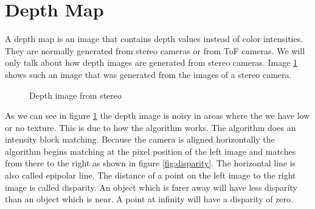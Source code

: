 \documentclass[11pt,a4paper,titlepage,oneside]{report}
\begin{document}
\section{Depth Map}

A depth map is an image that contains depth values instead of color intensities. They are normally generated from stereo cameras or from ToF cameras. We will only talk about how depth images are generated from stereo cameras. Image \ref{fig:depth} shows such an image that was generated from the images of a stereo camera.

\begin{figure}[H]
	\centering
	\caption{Depth image from stereo}\label{fig:depth}
\end{figure}

As we can see in figure \ref{fig:depth} the depth image is noisy in areas where the we have low or no texture. This is due to how the algorithm works. The algorithm does an intensity block matching. Because the camera is aligned horizontally the algorithm begins matching at the pixel position of the left image and matches from there to the right as shown in figure \ref{fig:disparity}. The horizontal line is also called epipolar line. The distance of a point on the left image to the right image is called disparity. An object which is farer away will have less disparity than an object which is near. A point at infinity will have a disparity of zero.
\end{document}
